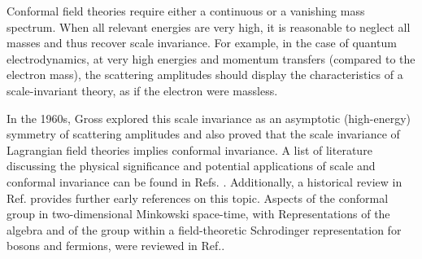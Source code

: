 \documentclass[%
 reprint,
superscriptaddress,
 amsmath,amssymb,
 aps,
]{revtex4-2}
\begin{document}
Conformal field theories require either a continuous or a vanishing mass spectrum. When all relevant energies are very high, it is reasonable to neglect all masses and thus recover scale invariance. For example, in the case of quantum electrodynamics, at very high energies and momentum transfers (compared to the electron mass), the scattering amplitudes should display the characteristics of a scale-invariant theory, as if the electron were massless. 

In the 1960s, Gross \cite{Gross1970} explored this scale invariance as an asymptotic (high-energy) symmetry of scattering amplitudes and also proved that the scale invariance of Lagrangian field theories implies conformal invariance. A list of literature discussing the physical significance and potential applications of scale and conformal invariance can be found in Refs. \cite{Wess1960, Gürsey1956, Fulton1962, Kastrup1966, SalamMack1969, Wilson1969, Gross1970}. Additionally, a historical review in Ref. \cite{Kastrup2008} provides further early references on this topic. Aspects of the conformal group in two-dimensional Minkowski space-time, with Representations of the algebra and of the group within a field-theoretic Schrodinger representation for bosons and fermions, were reviewed in Ref.\cite{Jackiw1990}.
\end{document}

